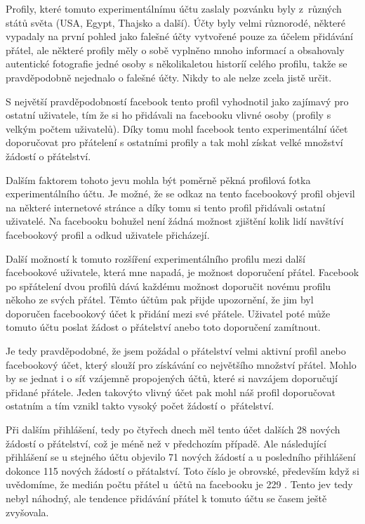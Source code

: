 \documentclass[thesis=M,czech]{FITthesis}[2013/05/10]
\begin{document}
Profily, které tomuto experimentálnímu účtu zaslaly pozvánku byly z~různých států světa (USA, Egypt, Thajsko a další). Účty byly velmi různorodé, některé vypadaly na první pohled jako falešné účty vytvořené pouze za účelem přidávání přátel, ale některé profily měly o sobě vyplněno mnoho informací a obsahovaly autentické fotografie jedné osoby s několikaletou historíí celého profilu, takže se pravděpodobně nejednalo o falešné účty. Nikdy to ale nelze zcela jistě určit. 

S největší pravděpodobností facebook tento profil vyhodnotil jako zajímavý pro ostatní uživatele, tím že si ho přidávali na facebooku vlivné osoby (profily s velkým počtem uživatelů). Díky tomu mohl facebook tento experimentální účet doporučovat pro přátelení s ostatními profily a tak mohl získat velké množství žádostí o přátelství.

Dalším faktorem tohoto jevu mohla být poměrně pěkná profilová fotka experimentálního účtu. Je možné, že se odkaz na tento facebookový profil objevil na některé internetové stránce a díky tomu si tento profil přidávali ostatní uživatelé. Na facebooku bohužel není žádná možnost zjištění kolik lidí navštíví facebookový profil a odkud uživatele přicházejí.

Další možností k tomuto rozšíření experimentálního profilu mezi další facebookové uživatele, která mne napadá, je možnost doporučení přátel. Facebook po spřátelení dvou profilů dává každému možnost doporučit novému profilu někoho ze svých přátel. Těmto účtům pak přijde upozornění, že jim byl doporučen facebookový  účet k přidání mezi své přátele. Uživatel poté může tomuto účtu poslat žádost o přátelství anebo toto doporučení zamítnout. 

Je tedy pravděpodobné, že jsem požádal o přátelství velmi aktivní profil anebo facebookový účet, který slouží pro získávání co největšího množství přátel. Mohlo by se jednat i o síť vzájemně propojených účtů, které si navzájem doporučují přidané přátele. Jeden takovýto vlivný účet pak mohl náš profil doporučovat ostatním a tím vznikl takto vysoký počet žádostí o~přátelství.

Při dalším přihlášení, tedy po čtyřech dnech měl tento účet dalších 28 nových žádostí o přátelství, což je méně než v předchozím případě. Ale následující přihlášení se u stejného účtu objevilo 71 nových žádostí a u posledního přihlášení dokonce 115 nových žádostí o přátalství. Toto číslo je obrovské, především když si uvědomíme, že medián počtu přátel u~účtů na facebooku je 229 \cite{web:fbFriendsMedian}. Tento jev tedy nebyl náhodný, ale tendence přidávání přátel k tomuto účtu se časem ještě zvyšovala.
\end{document}
